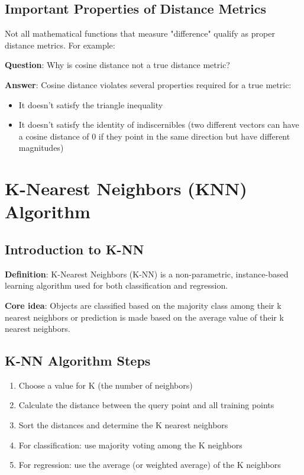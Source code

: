 \documentclass[12pt]{article}
\begin{document}
\subsection{Important Properties of Distance Metrics}
Not all mathematical functions that measure "difference" qualify as proper distance metrics. For example:

\textbf{Question}: Why is cosine distance not a true distance metric?

\textbf{Answer}: Cosine distance violates several properties required for a true metric:
\begin{itemize}
    \item It doesn't satisfy the triangle inequality
    \item It doesn't satisfy the identity of indiscernibles (two different vectors can have a cosine distance of 0 if they point in the same direction but have different magnitudes)
\end{itemize}

\section{K-Nearest Neighbors (KNN) Algorithm}
\subsection{Introduction to K-NN}

\textbf{Definition}: K-Nearest Neighbors (K-NN) is a non-parametric, instance-based learning algorithm used for both classification and regression.

\textbf{Core idea}: Objects are classified based on the majority class among their k nearest neighbors or prediction is made based on the average value of their k nearest neighbors.

\subsection{K-NN Algorithm Steps}
\begin{enumerate}
    \item Choose a value for K (the number of neighbors)
    \item Calculate the distance between the query point and all training points
    \item Sort the distances and determine the K nearest neighbors
    \item For classification: use majority voting among the K neighbors
    \item For regression: use the average (or weighted average) of the K neighbors
\end{enumerate}
\end{document}

